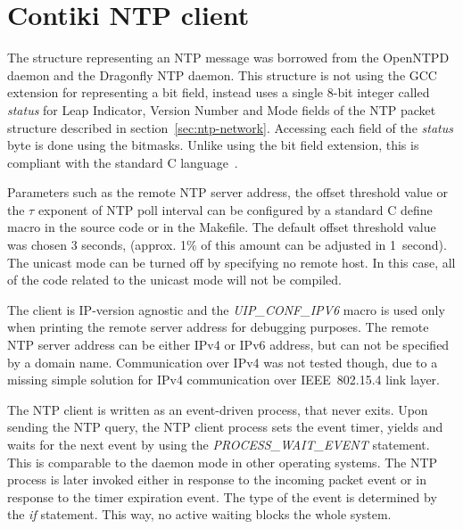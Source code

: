 
\section{Contiki NTP client}
The structure representing an NTP message was borrowed from the OpenNTPD daemon
and the Dragonfly NTP daemon.
This structure is not using the GCC extension for representing a bit field,
instead uses a single 8-bit integer called {\it{status}}
for Leap Indicator, Version Number and Mode fields of the NTP packet
structure described in section~\ref{sec:ntp-network}.
Accessing each field of the {\it{status}} byte is done using the bitmasks.
Unlike using the bit field extension,
this is compliant with the standard C language~\cite{c99}.

Parameters such as the remote NTP server address, the offset threshold value
or the $\tau$ exponent of NTP poll interval can be configured by a standard C define macro
in the source code or in the Makefile.
The default offset threshold value was chosen 3 seconds,
(approx. 1\% of this amount can be adjusted in 1~second).
The unicast mode can be turned off by specifying no remote host.
In this case, all of the code related to the unicast mode will not be compiled.

The client is IP-version agnostic and the {\it{UIP\_CONF\_IPV6}} macro is used only
when printing the remote server address for debugging purposes.
The remote NTP server address can be either IPv4 or IPv6 address,
but can not be specified by a domain name.
Communication over IPv4 was not tested though, due to a missing simple solution for
IPv4 communication over IEEE~802.15.4 link layer. %

The NTP client is written as an event-driven process, that never exits.
Upon sending the NTP query, the NTP client process sets the event timer,
yields and waits for the next event by using the {\it{PROCESS\_WAIT\_EVENT}} statement.
This is comparable to the daemon mode in other operating systems.
The NTP process is later invoked either in response to the incoming packet event
or in response to the timer expiration event.
The type of the event is determined by the {\it{if}} statement.
This way, no active waiting blocks the whole system.

